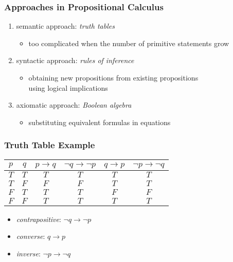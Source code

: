 \documentclass[dvipsnames]{beamer}
\begin{document}
\begin{frame}
  \frametitle{Approaches in Propositional Calculus}

  \begin{enumerate}
    \item semantic approach: \emph{truth tables}
    \begin{itemize}
      \item too complicated when the number of primitive statements grow
    \end{itemize}

    \pause
    \item syntactic approach: \emph{rules of inference}
    \begin{itemize}
      \item obtaining new propositions from existing propositions\\
        using logical implications
    \end{itemize}

    \pause
    \item axiomatic approach: \emph{Boolean algebra}
    \begin{itemize}
      \item substituting equivalent formulas in equations
    \end{itemize}
  \end{enumerate}
\end{frame}

\begin{frame}
  \frametitle{Truth Table Example}

  \begin{example}[$p \rightarrow q$]
    \begin{center}
      \begin{tabular}{|c|c||c|c|c|c|}\hline
        $p$ & $q$ & $p \rightarrow q$ & $\neg q \rightarrow \neg p$
            & $q \rightarrow p$ & $\neg p \rightarrow \neg q$\\\hline\hline
        $T$ & $T$ & $T$ & $T$ & $T$ & $T$\\\hline
        $T$ & $F$ & $F$ & $F$ & $T$ & $T$\\\hline
        $F$ & $T$ & $T$ & $T$ & $F$ & $F$\\\hline
        $F$ & $F$ & $T$ & $T$ & $T$ & $T$\\\hline
      \end{tabular}
    \end{center}

    \pause
    \begin{itemize}
      \item \emph{contrapositive}: $\neg q \rightarrow \neg p$

      \pause
      \item \emph{converse}: $q \rightarrow p$

      \pause
      \item \emph{inverse}: $\neg p \rightarrow \neg q$
    \end{itemize}
  \end{example}
\end{frame}
\end{document}
